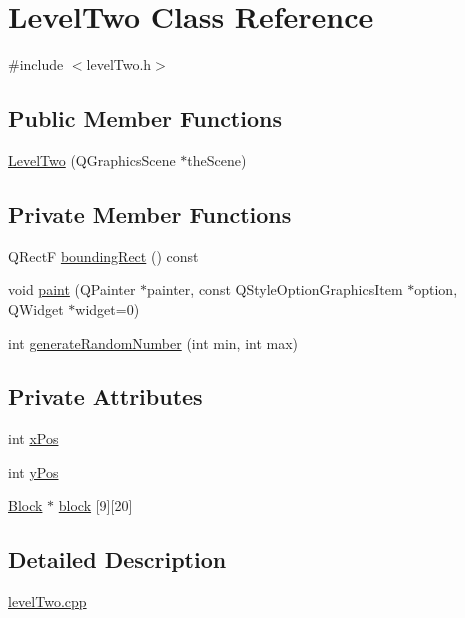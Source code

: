 \hypertarget{class_level_two}{
\section{LevelTwo Class Reference}
\label{class_level_two}
}


{\ttfamily \#include $<$levelTwo.h$>$}\subsection*{Public Member Functions}
\begin{DoxyCompactItemize}
\item 
\hyperlink{class_level_two_ab23f2b6ad1caa4b7854545e0e3ff9baf}{LevelTwo} (QGraphicsScene $\ast$theScene)
\end{DoxyCompactItemize}
\subsection*{Private Member Functions}
\begin{DoxyCompactItemize}
\item 
QRectF \hyperlink{class_level_two_a561fec1e212f4d26804a366a4cfbd1a0}{boundingRect} () const 
\item 
void \hyperlink{class_level_two_a447071bde5f8ea9035148d3e207b543b}{paint} (QPainter $\ast$painter, const QStyleOptionGraphicsItem $\ast$option, QWidget $\ast$widget=0)
\item 
int \hyperlink{class_level_two_a8ab22fa3c5b30e4ad12a2e15edc12de8}{generateRandomNumber} (int min, int max)
\end{DoxyCompactItemize}
\subsection*{Private Attributes}
\begin{DoxyCompactItemize}
\item 
int \hyperlink{class_level_two_a4987ce2b3abc9e124dfa2a33dd317474}{xPos}
\item 
int \hyperlink{class_level_two_ade98d942c5c10cf270c92d918417f0ef}{yPos}
\item 
\hyperlink{class_block}{Block} $\ast$ \hyperlink{class_level_two_ae2fcfa7a9a4c9feb00058ed9ab8c72d6}{block} \mbox{[}9\mbox{]}\mbox{[}20\mbox{]}
\end{DoxyCompactItemize}


\subsection{Detailed Description}
\hyperlink{level_two_8cpp}{levelTwo.cpp}

